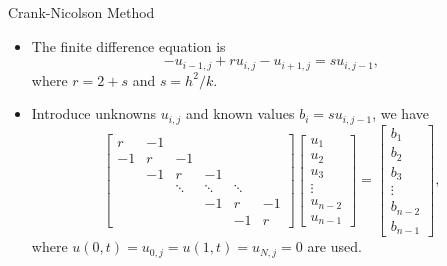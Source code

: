\documentclass{beamer}
\begin{document}
\begin{frame}{Crank-Nicolson Method}
    \begin{itemize}
        \item The finite difference equation is
        \[
        -u_{i-1,j}+r u_{i,j}-u_{i+1,j}=s u_{i,j-1},
        \] 
        where $r=2+s$ and $s=h^2/k$.
        \item Introduce unknowns $u_{i,j}$ and known values $b_i=s u_{i,j-1}$, we have 
$$
\left[\begin{array}{rrrrrr}
r & -1 & & & & \\
-1 & r & -1 & & & \\
& -1 & r & -1 & & \\
& & \ddots & \ddots & \ddots & \\
& & & -1 & r & -1 \\
& & & & -1 & r
\end{array}\right]\left[\begin{array}{c}
u_1 \\
u_2 \\
u_3 \\
\vdots \\
u_{n-2} \\
u_{n-1}
\end{array}\right]=\left[\begin{array}{c}
b_1 \\
b_2 \\
b_3 \\
\vdots \\
b_{n-2} \\
b_{n-1}
\end{array}\right],
$$
where $u(0,t)=u_{0,j}=u(1,t)=u_{N,j}=0$ are used.
\end{itemize}
\end{frame}
\end{document}
